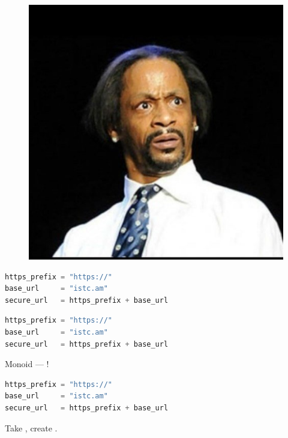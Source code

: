 \documentclass[aspectratio=169]{beamer}
\begin{document}
\begin{frame}
    \centering
        \begin{figure}[b]
            \includegraphics[scale=0.51]{img/what.jpg}
        \end{figure}
\end{frame}

\begin{frame}[fragile,t]
    \begin{lstlisting}[language=Python]
https_prefix = "https://"
base_url     = "istc.am"
secure_url   = https_prefix + base_url
    \end{lstlisting}
\end{frame}

\begin{frame}[fragile,t]
    \begin{lstlisting}[language=Python]
https_prefix = "https://"
base_url     = "istc.am"
secure_url   = https_prefix + base_url
    \end{lstlisting}

    \vspace{2em}

    \centering
        \Huge
            Monoid --- !
\end{frame}

\begin{frame}[fragile,t]
    \begin{lstlisting}[language=Python]
https_prefix = "https://"
base_url     = "istc.am"
secure_url   = https_prefix + base_url
    \end{lstlisting}

    \vspace{2em}

    \centering
        \Huge
            Take , create .
\end{frame}
\end{document}
